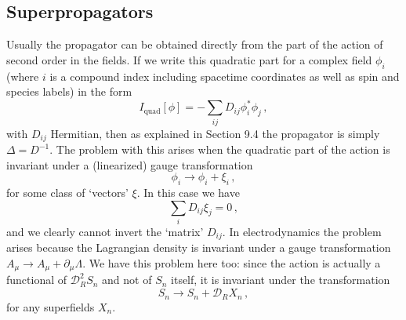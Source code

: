 
\providecommand{\SuperD}{\mathcal{D}}

\subsection{Superpropagators}

Usually the propagator can be obtained directly from the part of the action
of second order in the fields. If we write this quadratic part for a complex
field \(\phi_i\) (where \(i\) is a compound index including spacetime
coordinates as well as spin and species labels) in the form
\begin{equation}
  I_{\mathrm{quad}}[\phi]
  =-\sum_{ij}D_{ij}\phi_i^*\phi_j\,,
  \tag{30.2.1}\label{eq:30.2.1}
\end{equation}
with \(D_{ij}\) Hermitian, then as explained in Section 9.4 the propagator is
simply \(\Delta=D^{-1}\). The problem with this arises when the quadratic
part of the action is invariant under a (linearized) gauge transformation
\begin{equation}
  \phi_i\longrightarrow\phi_i+\xi_i\,,
  \tag{30.2.2}\label{eq:30.2.2}
\end{equation}
for some class of `vectors' \(\xi\). In this case we have
\begin{equation}
  \sum_iD_{ij}\xi_j=0\,,
  \tag{30.2.3}\label{eq:30.2.3}
\end{equation}
and we clearly cannot invert the `matrix' \(D_{ij}\). In electrodynamics the
problem arises because the Lagrangian density is invariant under a gauge
transformation \(A_\mu\longrightarrow A_\mu+\partial_\mu\Lambda\). We have
this problem here too: since the action is actually a functional of
\(\SuperD_R^2S_n\) and not of \(S_n\) itself, it is invariant under the
transformation
\begin{equation}
  S_n\longrightarrow S_n+\SuperD_RX_n\,,
  \tag{30.2.4}\label{eq:30.2.4}
\end{equation}
for any superfields \(X_n\).

